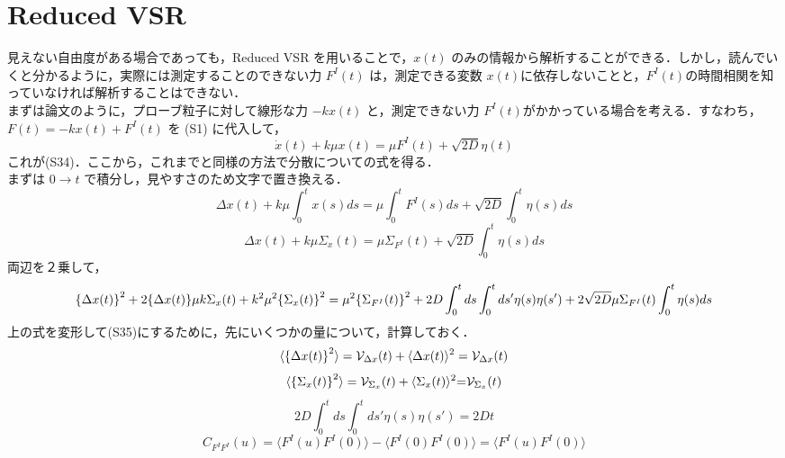 \documentclass{jsarticle}
\numberwithin{equation}{section}
\theoremstyle{definition}
\begin{document}
\section{Reduced VSR }
見えない自由度がある場合であっても，Reduced VSR を用いることで，$x(t)$ のみの情報から解析することができる．しかし，読んでいくと分かるように，実際には測定することのできない力 $F^I (t)$ は，測定できる変数 $x(t)$に依存しないことと，$F^I (t)$の時間相関を知っていなければ解析することはできない．\\
\quad まずは論文のように，プローブ粒子に対して線形な力 $-kx(t) $ と，測定できない力 $F^I (t)$がかかっている場合を考える．すなわち，$F(t) = -kx(t) + F^I (t)$ を (S1) に代入して，
\begin{equation}
  \dot{x} (t) + k \mu x(t) = \mu F^I (t) + \sqrt{2D} \eta (t)
\end{equation}
これが(S34)．ここから，これまでと同様の方法で分散についての式を得る．\\
\quad まずは $0 \to t$ で積分し，見やすさのため文字で置き換える．
\begin{equation}
  \Delta x(t) + k \mu \int_0^t x(s) ds = \mu \int_0^t F^I (s) ds + \sqrt{2D} \int_0^t \eta(s) ds 
\end{equation}
\begin{equation}
  \Delta x(t) + k \mu \Sigma_x (t) = \mu \Sigma_{F^I} (t) + \sqrt{2D} \int_0^t \eta(s) ds 
\end{equation}
両辺を２乗して，
\begin{equation}
  \label{nizyo}
  \qty{\Delta x(t)}^2 + 2 \qty{\Delta x(t)} \mu k \Sigma_x (t) + k^2 \mu^2 \qty{\Sigma_x (t)}^2 = \mu^2 \qty{\Sigma_{F^I} (t) }^2 + 2D \int_0^t ds \int_0^t ds' \eta(s) \eta(s') + 2 \sqrt{2D} \mu \Sigma_{F^I} (t) \int_0^t \eta (s) ds 
\end{equation}
上の式を変形して(S35)にするために，先にいくつかの量について，計算しておく．
\begin{equation}
  \label{zyoken1}
  \langle \qty{\Delta x(t)}^2 \rangle = \mathcal{V} _{\Delta x} (t) + \langle \Delta x(t) \rangle ^2 = \mathcal{V} _{\Delta x} (t)
\end{equation}
\begin{equation}
  \langle \qty{\Sigma_x (t)}^2 \rangle = \mathcal{V} _{\Sigma_x} (t) + \langle \Sigma_x (t) \rangle ^2 {=} \mathcal{V} _{\Sigma_x} (t) 
\end{equation}
\begin{equation}
  2D \int_0^t ds \int_0^t ds' \eta(s) \eta(s') = 2Dt 
\end{equation}
\begin{equation}
  C_{F^I F^I} (u) = \langle F^I (u) F^I (0) \rangle - \langle F^I (0) F^I (0) \rangle = \langle F^I (u) F^I (0) \rangle
\end{equation}
\end{document}
